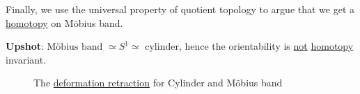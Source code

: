 \begin{eg}
\begin{enumerate}
		      \par Finally, we use the universal property of quotient topology to argue that we get a
		      \hyperref[def:homotopy]{homotopy} on Möbius band.

		      \textbf{Upshot}: \(\text{Möbius band } \simeq S^1 \simeq \text{ cylinder} \), hence the orientability
		      is \underline{not} \hyperref[def:homotopy]{homotopy} invariant.
		      \begin{figure}[H]
			      \centering
			      \caption{The \hyperref[def:deformation-retraction]{deformation retraction} for Cylinder and Möbius band}
			      \label{fig:eg:cylinder-mobiusband}
		      \end{figure}
	\end{enumerate}
\end{eg}
